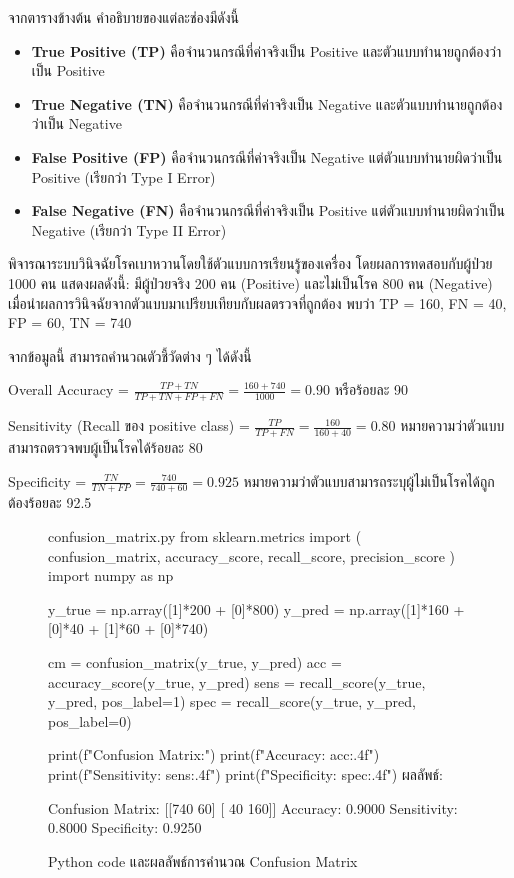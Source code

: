 จากตารางข้างต้น คำอธิบายของแต่ละช่องมีดังนี้

\begin{itemize}
\item \textbf{True Positive (TP)} คือจำนวนกรณีที่ค่าจริงเป็น Positive และตัวแบบทำนายถูกต้องว่าเป็น Positive

\item \textbf{True Negative (TN)} คือจำนวนกรณีที่ค่าจริงเป็น Negative และตัวแบบทำนายถูกต้องว่าเป็น Negative

\item \textbf{False Positive (FP)} คือจำนวนกรณีที่ค่าจริงเป็น Negative แต่ตัวแบบทำนายผิดว่าเป็น Positive (เรียกว่า Type I Error)

\item \textbf{False Negative (FN)} คือจำนวนกรณีที่ค่าจริงเป็น Positive แต่ตัวแบบทำนายผิดว่าเป็น Negative (เรียกว่า Type II Error)
\end{itemize}

\begin{exmp}
พิจารณาระบบวินิจฉัยโรคเบาหวานโดยใช้ตัวแบบการเรียนรู้ของเครื่อง โดยผลการทดสอบกับผู้ป่วย 1000 คน แสดงผลดังนี้: มีผู้ป่วยจริง 200 คน (Positive) และไม่เป็นโรค 800 คน (Negative) เมื่อนำผลการวินิจฉัยจากตัวแบบมาเปรียบเทียบกับผลตรวจที่ถูกต้อง พบว่า TP = 160, FN = 40, FP = 60, TN = 740

จากข้อมูลนี้ สามารถคำนวณตัวชี้วัดต่าง ๆ ได้ดังนี้

Overall Accuracy = $\frac{TP + TN}{TP + TN + FP + FN} = \frac{160 + 740}{1000} = 0.90$ หรือร้อยละ 90

Sensitivity (Recall ของ positive class) = $\frac{TP}{TP + FN} = \frac{160}{160 + 40} = 0.80$ หมายความว่าตัวแบบสามารถตรวจพบผู้เป็นโรคได้ร้อยละ 80

Specificity = $\frac{TN}{TN + FP} = \frac{740}{740 + 60} = 0.925$ หมายความว่าตัวแบบสามารถระบุผู้ไม่เป็นโรคได้ถูกต้องร้อยละ 92.5
\end{exmp}

\begin{figure}[h]
\begin{pycode}{confusion\_matrix.py}
from sklearn.metrics import (
    confusion_matrix,
    accuracy_score,
    recall_score,
    precision_score
)
import numpy as np

y_true = np.array([1]*200 + [0]*800)
y_pred = np.array([1]*160 + [0]*40 +
                   [1]*60 + [0]*740)

cm = confusion_matrix(y_true, y_pred)
acc = accuracy_score(y_true, y_pred)
sens = recall_score(y_true, y_pred,
                    pos_label=1)
spec = recall_score(y_true, y_pred,
                    pos_label=0)

print(f"Confusion Matrix:")
print(f"Accuracy: {acc:.4f}")
print(f"Sensitivity: {sens:.4f}")
print(f"Specificity: {spec:.4f}")
\tcblower
ผลลัพธ์:

Confusion Matrix:
[[740  60]
 [ 40 160]]
Accuracy: 0.9000
Sensitivity: 0.8000
Specificity: 0.9250
\end{pycode}
\caption{Python code และผลลัพธ์การคำนวณ Confusion Matrix}
\label{fig:confusion_matrix_code}
\end{figure}

